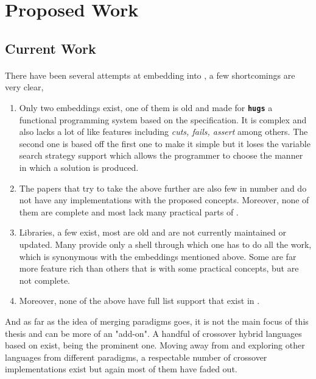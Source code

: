\documentclass[proposal.tex]{subfiles}
\begin{document}
\section{Proposed Work}\label{sect:proposedWork}
\subsection{Current Work}
\paragraph{}
There have been several attempts at embedding  into  , a few shortcomings are very clear,

\begin{enumerate}
\item Only two embeddings exist, one of them is old and made for \texttt{\bfseries{hugs}} a functional programming system based on the  specification. It is complex and also lacks a lot of  like features including \textit{cuts, fails, assert} among others. The second 
one is based off the first one to make it simple but it loses the variable search strategy support which allows the programmer to choose the manner in which a solution is produced. 

\item The papers that try to take the above further are also few in number and do not have any implementations with the proposed 
concepts. Moreover, none of them are complete and most lack many practical parts of .

\item Libraries, a few exist, most are old and are not currently maintained or updated. Many provide only a shell through which one has to do all the work, 
which is synonymous with the embeddings mentioned above. Some are far more feature rich than others that is with some practical  
concepts, but are not complete.

\item Moreover, none of the above have full list support that exist in .
\end{enumerate}

\par And as far as the idea of merging paradigms goes, it is not the main focus of this thesis and can be more of an "add-on". A handful of crossover hybrid 
languages based on  exist,  \cite{website:curry} being the prominent one. Moving away from  
and exploring other languages from different paradigms, a respectable number of crossover implementations exist but again most of them have faded out.   
\end{document}
